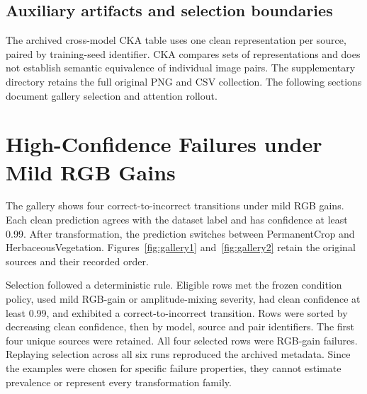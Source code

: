 \subsection{Auxiliary artifacts and selection boundaries}
The archived cross-model CKA table uses one clean representation per source, paired by training-seed identifier. CKA compares sets of representations and does not establish semantic equivalence of individual image pairs. The supplementary directory retains the full original PNG and CSV collection. The following sections document gallery selection and attention rollout.

\section{High-Confidence Failures under Mild RGB Gains}\label{app:qualitative}
The gallery shows four correct-to-incorrect transitions under mild RGB gains. Each clean prediction agrees with the dataset label and has confidence at least 0.99. After transformation, the prediction switches between PermanentCrop and HerbaceousVegetation. Figures~\ref{fig:gallery1} and~\ref{fig:gallery2} retain the original sources and their recorded order.

Selection followed a deterministic rule. Eligible rows met the frozen condition policy, used mild RGB-gain or amplitude-mixing severity, had clean confidence at least 0.99, and exhibited a correct-to-incorrect transition. Rows were sorted by decreasing clean confidence, then by model, source and pair identifiers. The first four unique sources were retained. All four selected rows were RGB-gain failures. Replaying selection across all six runs reproduced the archived metadata. Since the examples were chosen for specific failure properties, they cannot estimate prevalence or represent every transformation family.

